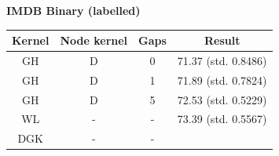 \documentclass{article}
\begin{document}
\textbf{IMDB Binary (labelled)}\\
\begin{minipage}{0.6\linewidth}
	\hspace*{-1in}

	\label{fig:imdb_labelled}
\end{minipage}
\begin{minipage}[c]{0.5\linewidth}	
	\centering
	\begin{tabular}{c|c|c|c}
		Kernel & Node kernel & Gaps & Result\\
		\hline
		GH & D & 0 & 71.37 (std. 0.8486)\\
		GH & D & 1 & 71.89 (std. 0.7824)\\
		GH & D & 5 & 72.53 (std. 0.5229)\\
		WL & - & - & 73.39 (std. 0.5567) \\
		DGK & - & - & \\
	\end{tabular}
	\label{table:imdb_labelled}
\end{minipage}
\end{document}
